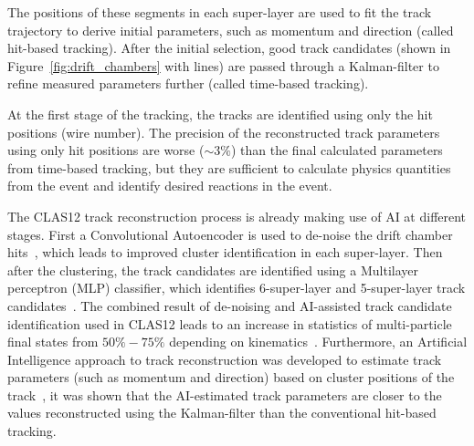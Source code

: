 \documentclass[a4paper,11pt]{article}
\begin{document}
The positions of these segments in each super-layer are used to fit the track trajectory 
to derive initial parameters, such as momentum and direction (called hit-based tracking).  After the initial selection, good track candidates 
(shown in Figure~\ref{fig:drift_chambers} with lines) are passed through a Kalman-filter to 
refine measured parameters further (called time-based tracking).

At the first stage of the tracking, the tracks are identified using only the hit positions (wire number). The precision 
of the reconstructed track parameters using only hit positions are worse ($\sim3\%$) than the final calculated parameters from time-based tracking, but they are sufficient to calculate physics quantities from the event and identify desired reactions in the event. 


The CLAS12 track reconstruction process is already making use of AI at different stages.
First a Convolutional
Autoencoder is used to de-noise the drift chamber hits~\cite{Thomadakis:2022zcd}, which leads to improved cluster
identification in each super-layer. Then after the clustering, the track candidates are identified using a Multilayer perceptron (MLP) classifier,
which identifies 6-super-layer and 5-super-layer track candidates~\cite{Gavalian:2020oxg}. The combined result of
de-noising and AI-assisted track candidate identification used in CLAS12 leads to an increase in statistics of multi-particle 
final states from $50\%-75\%$ depending on kinematics~\cite{Gavalian:2020xmc}. 
Furthermore, an Artificial Intelligence approach to track reconstruction was developed to estimate track parameters 
(such as momentum and direction) based on cluster positions of the track~\cite{Thomadakis:2023ebe}, it was shown that 
the AI-estimated track parameters are closer to the values reconstructed using the Kalman-filter than the 
conventional hit-based tracking.
\end{document}

